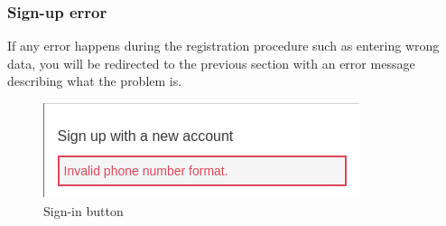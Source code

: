 \subsubsection{Sign-up error}
If any error happens during the registration procedure such as entering wrong data, you will be redirected to the previous section with an error message describing what the problem is.
\begin{figure}[!ht]
    \caption{Sign-in button}
    \vspace{10px}
    \includegraphics[scale=0.5]{../../../../Images/userManual/wrongData.png}
    \centering
\end{figure}
\newpage
